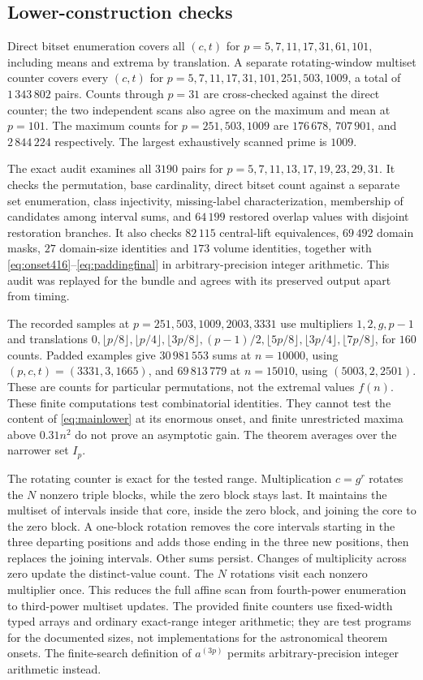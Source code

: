 \documentclass[10pt]{amsart}
\theoremstyle{remark}
\begin{document}
\subsection{Lower-construction checks}
Direct bitset enumeration covers all $(c,t)$ for
$p=5,7,11,17,31,61,101$, including means and extrema by translation.
A separate rotating-window multiset counter covers every $(c,t)$ for
$p=5,7,11,17,31,101,251,503,1009$, a total of $1\,343\,802$ pairs.
Counts through $p=31$ are cross-checked against the direct counter;
the two independent scans also agree on the maximum and mean at
$p=101$. The maximum counts for $p=251,503,1009$ are
$176\,678$, $707\,901$, and $2\,844\,224$ respectively.
The largest exhaustively scanned prime is $1009$.

The exact audit examines all $3190$ pairs for
$p=5,7,11,13,17,19,23,29,31$. It checks the permutation, base
cardinality, direct bitset count against a separate set enumeration,
class injectivity, missing-label characterization, membership of
candidates among interval sums, and $64\,199$ restored overlap
values with disjoint restoration branches. It also checks $82\,115$
central-lift equivalences, $69\,492$ domain masks, $27$ domain-size
identities and $173$ volume identities, together with
\eqref{eq:onset416}--\eqref{eq:paddingfinal} in arbitrary-precision
integer arithmetic. This audit was replayed for the bundle and agrees
with its preserved output apart from timing.

The recorded samples at $p=251,503,1009,2003,3331$ use multipliers
$1,2,g,p-1$ and translations
$0,\lfloor p/8\rfloor,\lfloor p/4\rfloor,\lfloor3p/8\rfloor,
(p-1)/2,\lfloor5p/8\rfloor,\lfloor3p/4\rfloor,\lfloor7p/8\rfloor$,
for $160$ counts. Padded examples give $30\,981\,553$ sums at
$n=10000$, using $(p,c,t)=(3331,3,1665)$, and $69\,813\,779$ at
$n=15010$, using $(5003,2,2501)$. These are counts for particular
permutations, not the extremal values $f(n)$.
These finite computations test combinatorial identities. They cannot
test the content of \eqref{eq:mainlower} at its enormous onset, and
finite unrestricted maxima above $0.31n^2$ do not prove an asymptotic
gain. The theorem averages over the narrower set $I_p$.

The rotating counter is exact for the tested range. Multiplication
$c=g^r$ rotates the $N$ nonzero triple blocks, while the zero block
stays last. It maintains the multiset of intervals inside that core,
inside the zero block, and joining the core to the zero block.
A one-block rotation removes the core intervals starting in the
three departing positions and adds those ending in the three new
positions, then replaces the joining intervals. Other sums persist.
Changes of multiplicity across zero update the distinct-value count.
The $N$ rotations visit each nonzero multiplier once. This reduces
the full affine scan from fourth-power enumeration to third-power
multiset updates. The provided finite counters use fixed-width typed
arrays and ordinary exact-range integer arithmetic; they are test
programs for the documented sizes, not implementations for the
astronomical theorem onsets. The finite-search definition of
$a^{(3p)}$ permits arbitrary-precision integer arithmetic instead.
\end{document}

